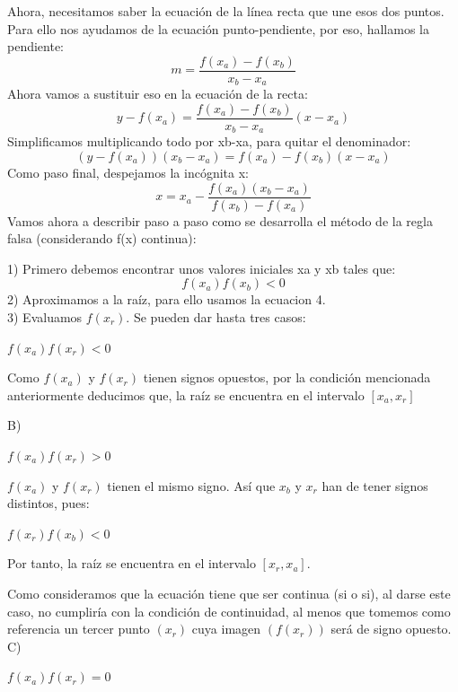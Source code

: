 \documentclass{article}
\begin{document}
\begin{multicols}{2}
 
Ahora, necesitamos saber la ecuación de la línea recta que une esos dos puntos. Para ello nos ayudamos de la ecuación punto-pendiente, por eso, hallamos la pendiente:
\begin{equation}
m=\frac{f(x_{a})-f(x_{b})}{x_{b}-x_{a}}
\end{equation}
Ahora vamos a sustituir eso en la ecuación de la recta:
\begin{equation}
y-f(x_{a})=\frac{f(x_{a})-f(x_{b})}{x_{b}-x_{a}} (x-x_{a})
\end{equation}
Simplificamos multiplicando todo por xb-xa, para quitar el denominador:
\begin{equation}
(y-f(x_{a}))(x_{b}-x_{a})=f(x_{a})-f(x_{b})(x-x_{a})
\end{equation}
Como paso final, despejamos la incógnita x:
\begin{equation}
x=x_{a}-\frac{f(x_{a})(x_{b}-x_{a})}{f(x_{b})-f(x_{a})}
\end{equation}
Vamos ahora a describir paso a paso como se desarrolla el método de la regla falsa (considerando f(x) continua):

1) Primero debemos encontrar unos valores iniciales xa y xb tales que:
\begin{equation}
f(x_{a})f(x_{b})<0
\end{equation}
2) Aproximamos a la raíz, para ello usamos la ecuacion 4.
\\
3) Evaluamos $f(x_{r})$. Se pueden dar hasta tres casos:
\begin{center}
$f(x_{a})f(x_{r})<0$
\end{center}
Como $f(x_{a})$ y $f(x_{r})$ tienen signos opuestos, por la condición mencionada anteriormente deducimos que, la raíz se encuentra en el intervalo $[x_{a}, x_{r}]$

B)
\begin{center}
$f(x_{a})f(x_{r})>0$
\end{center}


$f(x_{a})$ y $f(x_{r})$ tienen el mismo signo. Así que $x_{b}$ y $x_{r}$ han de tener signos distintos, pues:

\begin{center}
$f(x_{r})f(x_{b})<0$
\end{center}


Por tanto, la raíz se encuentra en el intervalo $[x_{r}, x_{a}]$.

Como consideramos que la ecuación tiene que ser continua (si o si), al darse este caso, no cumpliría con la condición de continuidad, al menos que tomemos como referencia un tercer punto $(x_{r})$ cuya imagen $(f(x_{r}))$ será de signo opuesto.
\\
C)
\begin{center}
$f(x_{a})f(x_{r})=0$
\end{center}



\end{multicols}
\end{document}

